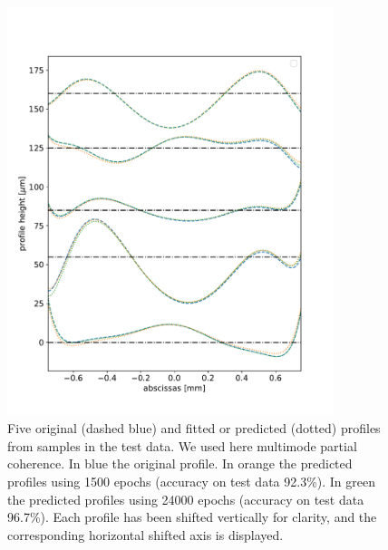 \documentclass{iucr}
\newcommand{\inred}[1]{{\color{black}#1}}
\begin{document}
\begin{figure}\label{fig:multimode}
\includegraphics[width=0.85\textwidth]{figures/figure6.pdf}
\caption{
Five original (dashed blue) and fitted or predicted (dotted) profiles from samples in the test data. We used here multimode partial coherence. \inred{In blue the original profile. In orange the predicted profiles using 1500 epochs (accuracy on test data 92.3\%). In green the predicted profiles using 24000 epochs (accuracy on test data 96.7\%). Each profile has been shifted vertically for clarity, and the corresponding horizontal shifted axis is displayed.
    }}
\end{figure}
\end{document}
